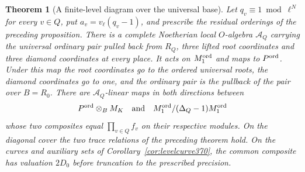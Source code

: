 \documentclass[a4paper,11pt]{article}
\newtheorem{theorem}[proposition]{Theorem}
\theoremstyle{definition}
\theoremstyle{remark}
\numberwithin{equation}{section}
\begin{document}
\begin{theorem}[A finite-level diagram over the universal base]\leavevmode
\label{thm:finitelevel406}
Let \(q_v\equiv1\bmod\ell^N\) for every \(v\in Q\), put
\(a_v=v_\ell(q_v-1)\), and prescribe the residual orderings
of the preceding proposition. There is a complete Noetherian
local \(O\)-algebra \(\mathcal A_Q\) carrying the universal
ordinary pair pulled back from \(R_Q\), three lifted root
coordinates and three diamond coordinates at every place.
It acts on \(M_1^{\rm ord}\) and maps to \(P^{\rm ord}\).
Under this map the root coordinates go to the ordered
universal roots, the diamond coordinates go to one, and
the ordinary pair is the pullback of the pair over \(B=R_0\).
There are \(\mathcal A_Q\)-linear maps in both directions
between
\[
   P^{\rm ord}\otimes_B M_K \quad\text{and}\quad
                  M_1^{\rm ord}/(\Delta_Q-1)M_1^{\rm ord}
\]
whose two composites equal \(\prod_{v\in Q}f_v\) on their
respective modules. On the diagonal cover the two trace
relations of the preceding theorem hold. On the curves
and auxiliary sets of Corollary~\ref{cor:levelcurve370},
the common composite has valuation \(2D_0\) before
truncation to the prescribed precision.
\end{theorem}
\end{document}
